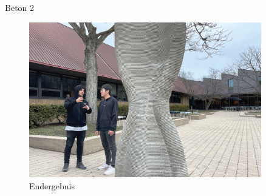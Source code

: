 \documentclass{beamer}
\begin{document}
\begin{frame}{Beton 2}
   \begin{figure}[htpb]
       \centering
       \includegraphics[width=0.9\textwidth]{figures/beispiele/meibodi-2023-3.jpg}
       \caption{Endergebnis}
       \label{fig:meibodi-2023-3}
   \end{figure} 
\end{frame}



%
\end{document}
